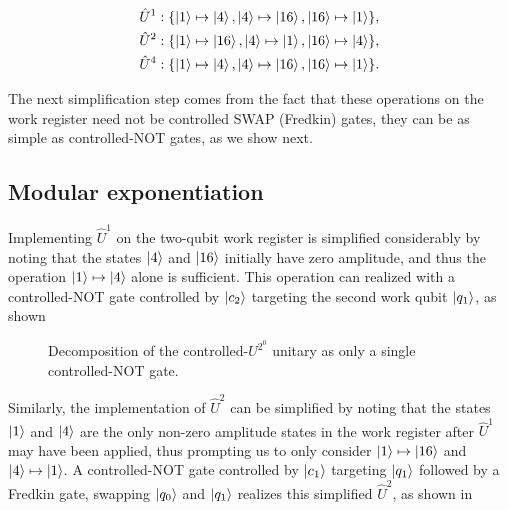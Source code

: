 \begin{align}
    \hat{U}^{1}: \{ \ket{1} \mapsto \ket{4},  \ket{4} \mapsto \ket{16}, \ket{16} \mapsto \ket{1} \}, \nonumber \\
    \hat{U}^{2}: \{ \ket{1} \mapsto \ket{16}, \ket{4} \mapsto \ket{1},  \ket{16} \mapsto \ket{4} \}, \nonumber \\
    \hat{U}^{4}: \{ \ket{1} \mapsto \ket{4},  \ket{4} \mapsto \ket{16}, \ket{16} \mapsto \ket{1} \}.
\end{align}

\noindent
The next simplification step comes from the fact that these operations on the work register need not be controlled SWAP (Fredkin) gates, they can be as simple as controlled-NOT gates, as we show next.


\subsection{Modular exponentiation}

Implementing $\hat{U}^{1}$ on the two-qubit work register is simplified considerably by noting that the states $\ket{4}$ and $\ket{16}$ initially have zero amplitude, and thus the operation $\ket{1} \mapsto \ket{4}$ alone is sufficient. This operation can realized with a controlled-NOT gate controlled by $\ket{c_2}$ targeting the second work qubit $\ket{q_1}$, as shown~

\begin{figure}[h]
	\centering
	\caption[Decomposition of the controlled-$U^{2^0}$ unitary]{Decomposition of the controlled-$U^{2^0}$ unitary as only a single controlled-NOT gate.}
\end{figure}

\noindent
Similarly, the implementation of $\hat{U}^{2}$ can be simplified by noting that the states $\ket{1}$ and $\ket{4}$ are the only non-zero amplitude states in the work register after $\hat{U}^1$ may have been applied, thus prompting us to only consider $\ket{1} \mapsto \ket{16}$ and $\ket{4} \mapsto \ket{1}$. A controlled-NOT gate controlled by $\ket{c_1}$ targeting $\ket{q_1}$ followed by a Fredkin gate, swapping $\ket{q_0}$ and $\ket{q_1}$ realizes this simplified $\hat{U}^{2}$, as shown in~

